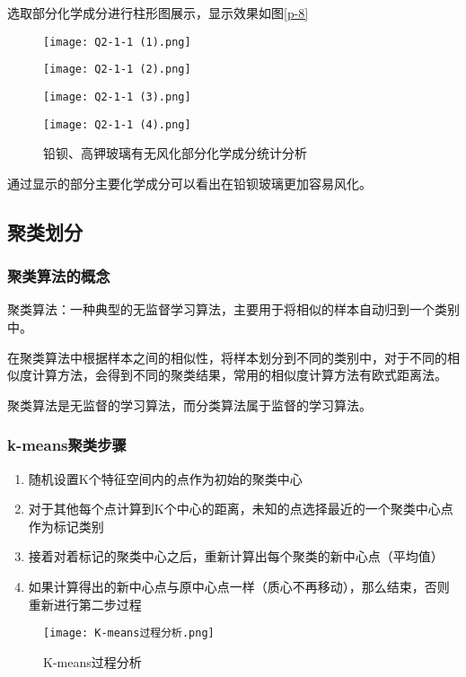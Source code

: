 选取部分化学成分进行柱形图展示，显示效果如图\ref{p-8}
\begin{figure}[h]
	\centering
	\begin{minipage}[b]{0.45\linewidth}
		\texttt{[image: Q2-1-1 (1).png]}		
	\end{minipage}
	\begin{minipage}[b]{0.45\linewidth}
		\texttt{[image: Q2-1-1 (2).png]}		
	\end{minipage}
	\begin{minipage}[b]{0.45\linewidth}
		\texttt{[image: Q2-1-1 (3).png]}		
	\end{minipage}
	\begin{minipage}[b]{0.45\linewidth}
		\texttt{[image: Q2-1-1 (4).png]}
	\end{minipage}
	\setlength{\abovecaptionskip}{3pt}%
	\caption{铅钡、高钾玻璃有无风化部分化学成分统计分析}
	\label{p-9}
\end{figure}

通过显示的部分主要化学成分可以看出在铅钡玻璃更加容易风化。

\subsection{聚类划分}
\subsubsection{聚类算法的概念}
聚类算法：一种典型的无监督学习算法，主要用于将相似的样本自动归到一个类别中。

在聚类算法中根据样本之间的相似性，将样本划分到不同的类别中，对于不同的相似度计算方法，会得到不同的聚类结果，常用的相似度计算方法有欧式距离法。

聚类算法是无监督的学习算法，而分类算法属于监督的学习算法。

\subsubsection{k-means聚类步骤}

\begin{enumerate}
	\item 随机设置K个特征空间内的点作为初始的聚类中心
	\item 对于其他每个点计算到K个中心的距离，未知的点选择最近的一个聚类中心点作为标记类别
	\item 接着对着标记的聚类中心之后，重新计算出每个聚类的新中心点（平均值）
	\item 如果计算得出的新中心点与原中心点一样（质心不再移动），那么结束，否则重新进行第二步过程
\end{enumerate}
\begin{figure}[!htbp]
	\centering
	\texttt{[image: K-means过程分析.png]}
	\setlength{\abovecaptionskip}{3pt}%
	\caption{K-means过程分析}
	\label{p-10}
\end{figure}

